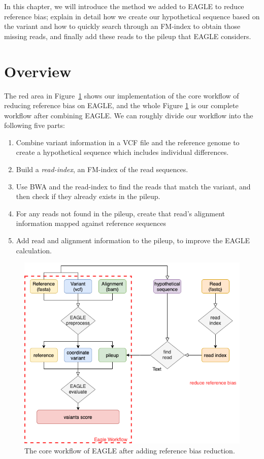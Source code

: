 \hspace{24pt}
In this chapter, we will introduce the method we added to EAGLE to reduce reference bias; explain in detail how we create our hypothetical sequence based on the variant and how to quickly search through an FM-index to obtain those missing reads, and finally add these reads to the pileup that EAGLE considers.
\section{Overview}
The red area in Figure~\ref{core-workflow} shows our implementation of the core workflow of reducing reference bias on EAGLE, and the whole Figure \ref{core-workflow} is our complete workflow after combining EAGLE. 
We can roughly divide our workflow into the following five parts:

\begin{enumerate}
\item Combine variant information in a VCF file and the reference genome to create a hypothetical sequence which includes individual differences.
\item Build a \textit{read-index}, an FM-index of the read sequences.
\item Use BWA and the read-index to find the reads that match the variant, and then check if they already exists in the pileup.
\item For any reads not found in the pileup, create that read's alignment information mapped against reference sequences 
\item Add read and alignment information to the pileup, to improve the EAGLE calculation.
\end{enumerate}

\begin{figure}[H]
\includegraphics[width=0.8\columnwidth]{body/image/core-workflow.png}
\caption[Core workflow]{The core workflow of EAGLE after adding reference bias reduction.}
\label{core-workflow}
\end{figure}

